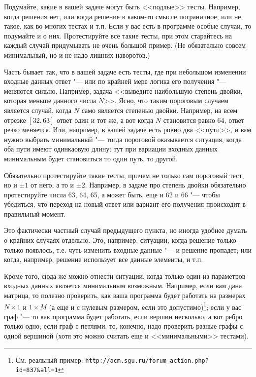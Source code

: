 \documentclass[a4paper,10pt]{problems}
\begin{document}
Подумайте, какие в вашей задаче могут быть <<подлые>> тесты. 
Например, когда решения нет, или когда решение в каком-то смысле пограничное, или не такое, как во многих тестах и т.п.
Если у вас есть в программе особые случаи, то подумайте и о них. 
Протестируйте все такие тесты, при этом старайтесь на каждый случай придумывать не очень большой пример. 
(Не обязательно совсем минимальный, но и не надо лишних наворотов.)

Часть бывает так, что в вашей задаче есть тесты, где при небольшом изменении входные данных ответ "--- или по крайней мере логика его получения "--- меняются сильно.
Например, задача <<выведите наибольшую степень двойки, которая меньше данного числа $N$>>. 
Ясно, что таким пороговым случаем является случай, когда $N$ само является степенью двойки. 
Например, на всем отрезке $[32,63]$ ответ один и тот же, а вот когда $N$ становится равно 64, ответ резко меняется.
Или, например, в вашей задаче есть ровно два <<пути>>, и вам нужно выбрать минимальный "--- тогда пороговой оказывается ситуация,
когда оба пути имеют одинкаовую длину: тут при вариации входных данных минимальным будет становиться то один путь, то другой.

Обязательно протестируйте такие тесты, причем не только сам пороговый тест, но и $\pm 1$ от него, а то и $\pm 2$. 
Например, в задаче про степень двойки обязательно протестируйте числа 63, 64, 65, а может быть, еще и 62 и 66 "--- 
чтобы убедиться, что переход на новый ответ или вариант его получения происходит в правильный момент.

Это фактически частный случай предыдущего пункта, но иногда удобнее думать о крайних случаях отдельно. 
Это, например, ситуации, когда решение только-только появлось, т.е. чуть изменить входные данные "--- и решение пропадет; или когда, например,
решение использует все данные элементы, и т.п.

Кроме того, сюда же можно отнести ситуации, когда только один из параметров входных данных является минимальным возможным. 
Например, если вам дана матрица, то полезно проверить, как ваша программа будет работать на размерах $N\times 1$ и $1\times M$ 
(а еще и с нулевым размером, если это допустимо)\footnote{См. реальный пример: \verb`http://acm.sgu.ru/forum_action.php?id=837&all=1`}; 
если у вас граф "--- то как программа будет работать, если вершин несколько, а вот ребро только одно;
если граф с петлями, то, конечно, надо проверить разные графы с одной вершиной (хотя это можно считать еще и <<минимальными>> тестами).
\end{document}
